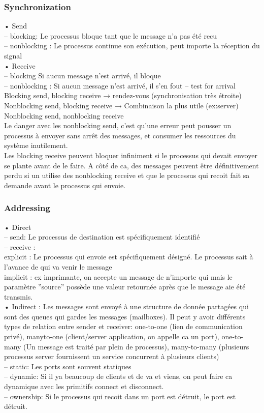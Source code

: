 \subsubsection{Synchronization}
• Send \\
– blocking: Le processus bloque tant que le message n’a pas été recu \\
– nonblocking : Le processus continue son exécution, peut importe la réception du signal \\
• Receive \\
– blocking Si aucun message n’est arrivé, il bloque \\
– nonblocking : Si aucun message n’est arrivé, il s’en fout – test for arrival \\
Blocking send, blocking receive → rendez-vous (synchronisation très étroite) Nonblocking send, blocking receive → Combinaison la plus utile (ex:server) Nonblocking send, nonblocking receive \\
Le danger avec les nonblocking send, c’est qu’une erreur peut pousser un processus à envoyer sans arrêt des messages, et consumer les ressources du système inutilement. \\
Les blocking receive peuvent bloquer infiniment si le processus qui devait envoyer se plante avant de le faire. A côté de ca, des messages peuvent être définitivement perdu si un utilise des nonblocking receive et que le processus qui recoit fait sa demande avant le processus qui envoie.
\subsubsection{Addressing}
• Direct \\
– send: Le processus de destination est spécifiquement identifié  \\
– receive : \\
explicit : Le processus qui envoie est spécifiquement désigné. Le processus sait à l’avance de qui va venir le message \\
implicit : ex imprimante, on accepte un message de n’importe qui mais le paramètre ”source” possède une valeur retournée après que le message aie été transmis. \\
• Indirect : Les messages sont envoyé à une structure de donnée partagées qui sont des queues qui gardes les messages (mailboxes). Il peut y avoir différents types de relation entre sender et receiver: one-to-one (lien de communication privé), manyto-one (client/server application, on appelle ca un port), one-to-many (Un message est traité par plein de processus), many-to-many (plusieurs processus server fournissent un service concurrent à plusieurs clients) \\
– static: Les ports sont souvent statiques \\
– dynamic: Si il ya beaucoup de clients et de va et viens, on peut faire ca
dynamique avec les primitifs connect et disconnect. \\
– ownership: Si le processus qui recoit dans un port est détruit, le port est détruit. \\
